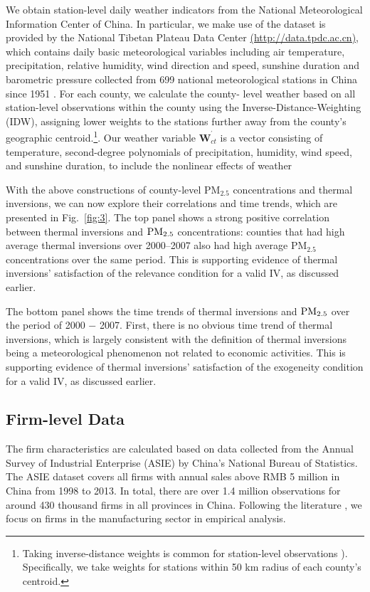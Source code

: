 \documentclass[12pt]{article}
\begin{document}
We obtain station-level daily weather indicators from the National
Meteorological Information Center of China. In particular, we make use of
the dataset is provided by the National Tibetan Plateau Data Center %
\url{(http://data.tpdc.ac.cn)}, which contains daily basic meteorological
variables including air temperature, precipitation, relative humidity, wind
direction and speed, sunshine duration and barometric pressure collected
from 699 national meteorological stations in China since 1951 %
\citep{Dailymeteorologicaldataset}. For each county, we calculate the county-
level weather based on all station-level observations within the county using the
Inverse-Distance-Weighting (IDW), assigning lower weights to the stations
further away from the county's geographic centroid.\footnote{Taking inverse-distance weights 
is common for station-level observations \citep[e.g.,][]{hanigan2006comparison,barreca2012climate,deschenes2011climate}). 
Specifically, we take weights for stations within 50 km radius 
of each county's centroid.}. Our weather variable $\mathbf{W}_{ct}^{^{\prime }}$ is a vector consisting of temperature, second-degree polynomials of precipitation,
humidity, wind speed, and sunshine duration, to
include the nonlinear effects of weather \citep{deschenes2017defensive,chen2022effect}

With the above constructions of county-level $\mathrm{PM_{2.5}}$
concentrations and thermal inversions, we can now explore their correlations
and time trends, which are presented in Fig.~\ref{fig:3}. The top panel
shows a strong positive correlation between thermal inversions and $\mathrm{%
PM_{2.5}}$ concentrations: counties that had high average thermal inversions
over 2000--2007 also had high average $\mathrm{PM_{2.5}}$ concentrations
over the same period. This is supporting evidence of thermal inversions'
satisfaction of the relevance condition for a valid IV,
as discussed earlier. 

The bottom panel shows the time trends of thermal inversions and $\mathrm{%
PM_{2.5}}$ over the period of 2000 $-$ 2007. First, there is no obvious time
trend of thermal inversions, which is largely consistent with the definition
of thermal inversions being a meteorological phenomenon not related to
economic activities. This is supporting evidence of thermal
inversions' satisfaction of the exogeneity condition for a valid
IV, as discussed earlier. 

\subsection{Firm-level Data}
\label{sec:data_firm} The firm characteristics are calculated based on data
collected from the Annual Survey of Industrial Enterprise (ASIE) by China's
National Bureau of Statistics. The ASIE dataset covers all firms with annual
sales above RMB 5 million in China from 1998 to 2013. In total, there are
over 1.4 million observations for around 430 thousand firms in all
provinces in China. Following the literature \citep[e.g.,][]{brandt2012creative, fu2021trans},
we focus on firms in the manufacturing sector in empirical analysis.
\end{document}
